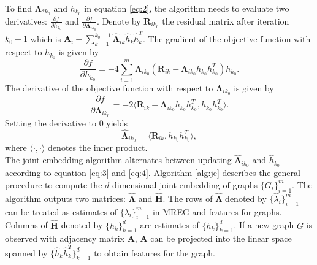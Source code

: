 \documentclass[10pt,journal,compsoc]{IEEEtran}
\newcommand{\bA}{\mathbf{A}}
\newcommand{\bH}{\mathbf{H}}
\newcommand{\bR}{\mathbf{R}}
\newcommand{\bLambda}{\mathbf{\Lambda}}
\begin{document}
\noindent To find $\bLambda_{*k_0}$ and $h_{k_0}$ in equation \eqref{eq:2}, the algorithm needs to evaluate two derivatives: $\frac{\partial f}{\partial h_{k_0}}$ and $\frac{\partial f}{\partial \bLambda_{i k_0}}$. Denote by $\bR_{ik_0}$ the residual matrix after iteration $k_0-1$ which is $\bA_i- \sum\limits_{k=1}^{k_0-1}\hat{\bLambda}_{ik} \hat{h}_{k} \hat{h}_{k}^T$. The gradient of the objective function with respect to $h_{k_0}$ is given by
\begin{equation} \label{eq:3}
\frac{\partial f}{\partial h_{k_0}} = -4\sum\limits_{i=1}^{m}  \bLambda_{ik_0} (\bR_{ik}-\bLambda_{ik_0} h_{k_0} h_{k_0}^T)  h_{k_0}.
\end{equation}
The derivative of the objective function with respect to $\bLambda_{i k_0}$ is given by
\[\frac{\partial f}{\partial \bLambda_{i k_0}}= -2 \langle \bR_{ik}-\bLambda_{ik_0} h_{k_0} h_{k_0}^T,h_{k_0} h_{k_0}^T\rangle.\]
Setting the derivative to $0$ yields
\begin{equation}  \label{eq:4}
\hat{\bLambda}_{i k_0} = \langle \bR_{ik}, h_{k_0} h_{k_0}^T \rangle,
\end{equation}
where $\langle \cdot , \cdot \rangle$ denotes the inner product. \\

\noindent The joint embedding algorithm alternates between updating $\hat{\bLambda}_{i k_0}$ and $\hat {h}_{k_0}$ according to equation \eqref{eq:3} and \eqref{eq:4}.  Algorithm \ref{alg:je} describes the general procedure to compute the $d$-dimensional joint embedding of graphs $\{G_i\}_{i=1}^m$. The algorithm outputs two matrices: $\hat{\bLambda}$ and $\hat{\bH}$. The rows of $\hat{\bLambda}$ denoted by $\{\hat{\lambda}_i\}_{i=1}^m$ can be treated as estimates of $\{\lambda_i\}_{i=1}^m$ in MREG and features for graphs. Columns of $\hat{\bH}$ denoted by $\{\hat{h}_k\}_{k=1}^d$ are estimates of $\{h_k\}_{k=1}^d$. If a new graph $G$ is observed with adjacency matrix $\bA$, $\bA$ can be projected into the linear space spanned by $\{\hat{h}_k \hat{h}_k^T\}_{k=1}^{d}$ to obtain features for the graph. \\
\end{document}
